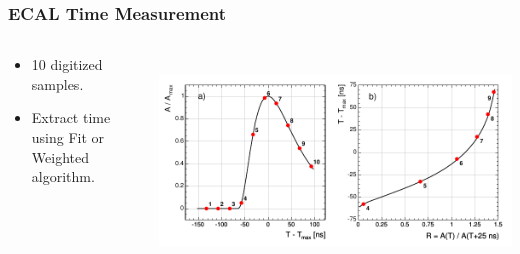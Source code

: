 \documentclass{beamer}
\begin{document}
\begin{frame}
\frametitle{\Huge{ECAL Time Measurement}}
 \begin{minipage}[t]{\paperwidth}
       \begin{tcolorbox}[colback=UNL@Cream!5,colframe=UNL@Cream!70,title=\textcolor{UMN@Maroon}{\textbf{\Large{Time Reconstruction}}}]
   \begin{columns}
    \begin{column}{0.450\linewidth}
         \begin{itemize}
          \item 10 digitized samples.
          \item Extract time using Fit or Weighted algorithm.
         \end{itemize}      
    \end{column}
    \begin{column}{0.75\linewidth}
    \mbox{
         \includegraphics[height=0.30\textwidth, width=0.65\linewidth]{THESISPLOTS/AmplitudeVsTMax.png} 
         }
    \end{column} 
   \end{columns}  
 \end{tcolorbox}
 

\end{minipage}
\end{frame}
\end{document}
